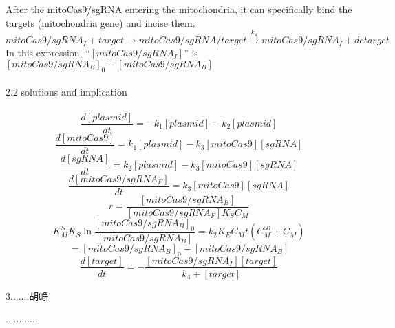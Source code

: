 \documentclass[UTF8]{ctexart}
\begin{document}
	After the mitoCas9/sgRNA entering the mitochondria, it can specifically bind the targets (mitochondria gene) and incise them.
	\begin{displaymath}
	mitoCas9/sgRNA_I+target\longrightarrow mitoCas9/sgRNA/target\stackrel{k_4} {\longrightarrow} mitoCas9/sgRNA_I+detarget
	\end{displaymath}
	In this expression, “$[mitoCas9/sgRNA_I]$” is $ [mitoCas9/sgRNA_B]_0-[mitoCas9/sgRNA_B]$ 
	\\\\
	{\Large 2.2 solutions and implication} 
	\\\\
	\begin{equation}
\frac{d[plasmid]}{dt}=-k_1[plasmid]-k_2[plasmid]\tag{1}
	\end{equation}
	\begin{equation}
	\frac{d[mitoCas9]}{dt}=k_1[plasmid]-k_3[mitoCas9][sgRNA]\tag{2}
	\end{equation}
	\begin{equation}
	\frac{d[sgRNA]}{dt}=k_2[plasmid]-k_3[mitoCas9][sgRNA]\tag{3}
	\end{equation}
	\begin{equation}
	\frac{d[mitoCas9/sgRNA_F]}{dt}=k_3[mitoCas9][sgRNA]\tag{4}
	\end{equation}
	\begin{equation}
    r=\frac{[mitoCas9/sgRNA_B]}{[mitoCas9/sgRNA_F]K_S C_M}\tag{5}
	\end{equation}
	\begin{equation}
	K_M^SK_S\ln\frac{[mitoCas9/sgRNA_B]_0}{[mitoCas9/sgRNA_B]}=k_2K_EC_Mt (C_M^{50}+C_M)\tag{6}
	\end{equation}
	\begin{equation}
    [mitoCas9/sgRNA_I]= [mitoCas9/sgRNA_B]_0-[mitoCas9/sgRNA_B]\tag{7}
	\end{equation}
	\begin{equation}
	\frac{d[target]}{dt}=-\frac{[mitoCas9/sgRNA_I][target]}{k_4+[target]}\tag{8}
	\end{equation}
	\begin{center}
	{\Large 3.......胡峥}
	\end{center}
............
\end{document}
